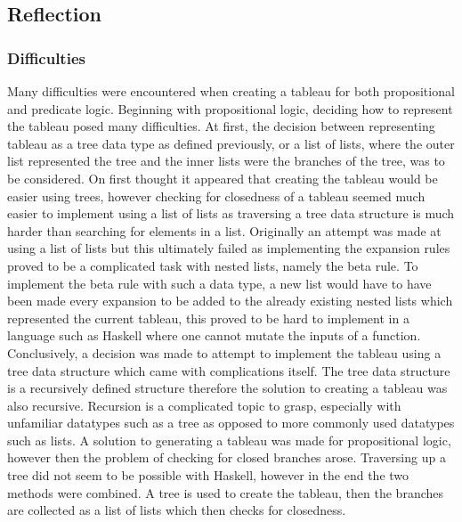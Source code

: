 \documentclass{article}%
\begin{document}
\subsection{Reflection}
\subsubsection{Difficulties} Many difficulties were encountered when creating a tableau for both propositional and predicate logic. Beginning with propositional logic, deciding how to represent the tableau posed many difficulties. At first, the decision between representing tableau as a tree data type as defined previously, or a list of lists, where the outer list represented the tree and the inner lists were the branches of the tree,  was to be considered. On first thought it appeared that creating the tableau would be easier using trees, however checking for closedness of a tableau seemed much easier to implement using a list of lists as traversing a tree data structure is much harder than searching for elements in a list. Originally an attempt was made at using a list of lists but this ultimately failed as implementing the expansion rules proved to be a complicated task with nested lists, namely the beta rule. To implement the beta rule with such a data type, a new list would have to have been made every expansion to be added to the already existing nested lists which represented the current tableau, this proved to be hard to implement in a language such as Haskell where one cannot mutate the inputs of a function. Conclusively, a decision was made to attempt to implement the tableau using a tree data structure which came with complications itself. The tree data structure is a recursively defined structure therefore the solution to creating a tableau was also recursive. Recursion is a complicated topic to grasp, especially with unfamiliar datatypes such as a tree as opposed to more commonly used datatypes such as lists. A solution to generating a tableau was made for propositional logic, however then the problem of checking for closed branches arose. Traversing up a tree did not seem to be possible with Haskell, however in the end the two methods were combined. A tree is used to create the tableau, then the branches are collected as a list of lists which then checks for closedness. 
\end{document}
